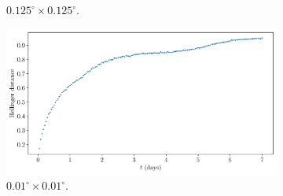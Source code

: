 \begin{figure}
\begin{center}
\begin{subfigure}{0.49\textwidth}
			\caption{\(0.125^\circ \times 0.125^\circ\).}
		\end{subfigure}
		\begin{subfigure}{0.49\textwidth}
			\includegraphics[width=\textwidth]{chp06_applications/figures/gulf_stream/traj_stoch_hell_dist_0.01}
			\caption{\(0.01^\circ \times 0.01^\circ\).}
		\end{subfigure}
		\caption{}
		\label{fig:natl_hell_bwidth}
	\end{center}
\end{figure}
